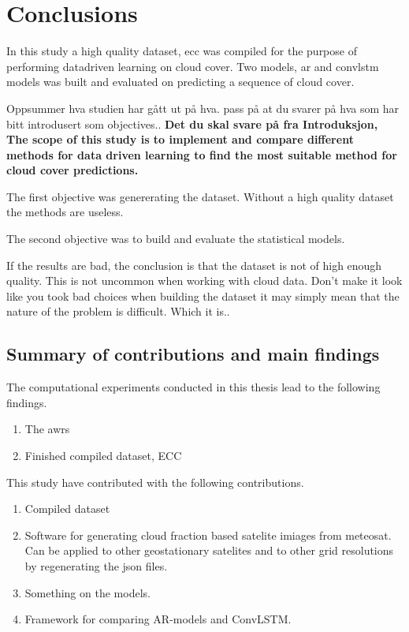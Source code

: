 \chapter{Conclusions}
In this study a high quality dataset, \acrfull{ecc} was compiled for the purpose of performing datadriven learning on cloud cover. Two models, \acrfull{ar} and \acrlong{convlstm} models was built and evaluated on predicting a sequence of cloud cover.

Oppsummer hva studien har gått ut på hva. pass på at du svarer på hva som har bitt introdusert som objectives.. \textbf{Det du skal svare på fra Introduksjon, The scope of this study is to implement and compare different methods for data driven learning to find the most suitable method for cloud cover predictions. }

The first objective was genererating the dataset. Without a high quality dataset the methods are useless. 

The second objective was to build and evaluate the statistical models. 


If the results are bad, the conclusion is that the dataset is not of high enough quality. This is not uncommon when working with cloud data. Don't make it look like you took bad choices when building the dataset it may simply mean that the nature of the problem is difficult. Which it is..



\section{Summary of contributions and main findings }
The computational experiments conducted in this thesis lead to the following findings. 
\begin{enumerate}
    \item The \acrfull{awrs}
    \item Finished compiled dataset, ECC
\end{enumerate}

This study have contributed with the following contributions.
\begin{enumerate}
    \item Compiled dataset 
    \item Software for generating cloud fraction based satelite imiages from meteosat. Can be applied to other geostationary satelites and to other grid resolutions by regenerating the json files.
    \item Something on the models. 
    \item Framework for comparing AR-models and ConvLSTM.
\end{enumerate}

